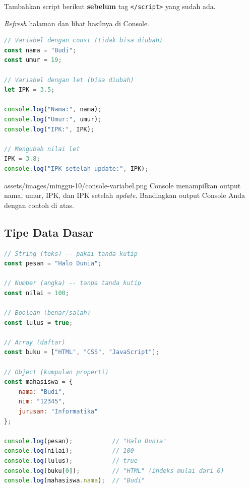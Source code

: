 \begin{langkah}
  \item Tambahkan script berikut \textbf{sebelum} tag \texttt{</script>} yang sudah ada.
  \item \emph{Refresh} halaman dan lihat hasilnya di Console.
\end{langkah}

\begin{lstlisting}[language=JavaScript, caption={Deklarasi variabel dan perubahan nilai}, label={lst:10-variabel}]
// Variabel dengan const (tidak bisa diubah)
const nama = "Budi";
const umur = 19;

// Variabel dengan let (bisa diubah)
let IPK = 3.5;

console.log("Nama:", nama);
console.log("Umur:", umur);
console.log("IPK:", IPK);

// Mengubah nilai let
IPK = 3.8;
console.log("IPK setelah update:", IPK);
\end{lstlisting}

\begin{tangkapanlayar}
  {assets/images/minggu-10/console-variabel.png}
  {Console menampilkan output nama, umur, IPK, dan IPK setelah \emph{update}.}
  {Bandingkan output Console Anda dengan contoh di atas.}
\end{tangkapanlayar}

\subsection{Tipe Data Dasar}

\begin{lstlisting}[language=JavaScript, caption={Tipe data dasar JavaScript}, label={lst:10-tipedata}]
// String (teks) -- pakai tanda kutip
const pesan = "Halo Dunia";

// Number (angka) -- tanpa tanda kutip
const nilai = 100;

// Boolean (benar/salah)
const lulus = true;

// Array (daftar)
const buku = ["HTML", "CSS", "JavaScript"];

// Object (kumpulan properti)
const mahasiswa = {
    nama: "Budi",
    nim: "12345",
    jurusan: "Informatika"
};

console.log(pesan);           // "Halo Dunia"
console.log(nilai);           // 100
console.log(lulus);           // true
console.log(buku[0]);         // "HTML" (indeks mulai dari 0)
console.log(mahasiswa.nama);  // "Budi"
\end{lstlisting}

